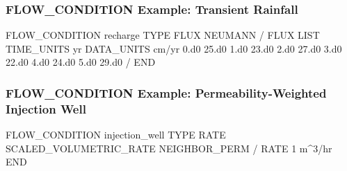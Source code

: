 \begin{frame}[fragile]\frametitle{FLOW\_CONDITION Example: Transient Rainfall}

\begin{semiverbatim}
FLOW_CONDITION recharge
  TYPE
    FLUX NEUMANN
  /
  FLUX LIST
    TIME_UNITS yr
    DATA_UNITS cm/yr
    0.d0 25.d0
    1.d0 23.d0
    2.d0 27.d0
    3.d0 22.d0
    4.d0 24.d0
    5.d0 29.d0
  /
END
\end{semiverbatim}

\end{frame}

\begin{frame}[fragile]\frametitle{FLOW\_CONDITION Example: Permeability-Weighted Injection Well}

\begin{semiverbatim}
FLOW_CONDITION injection_well
  TYPE
    RATE SCALED_VOLUMETRIC_RATE NEIGHBOR_PERM
  /
  RATE 1 m^3/hr
END
\end{semiverbatim}

\end{frame}
